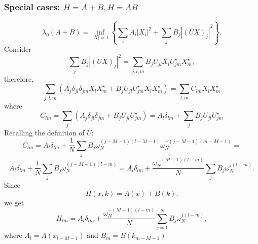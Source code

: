 \documentclass[12pt,a4paper]{article}
\begin{document}
\begin{appendices}
\subsubsection{Special cases: $H = A + B, H = AB$}
\[ \lambda_0 (A + B) = \inf_{| X | = 1} \left\{ \sum_i A_i  | X_i |^2 + \sum_j
   B_j | (U X)_j |^2 \right\} . \]
Consider
\[ \sum_j B_j | (U X)_j |^2 = \sum_{j, l, m} B_j U_{j l} X_l U^{\star}_{j m}
   X_m^{\star}, \]
therefore,
\[ \sum_{j, l, m} (A_j \delta_{j l} \delta_{j m} X_l X^{\star_{}}_m + B_j U_{j
   l} U_{j m}^{\star} X_l X^{\star_{}}_m) = \sum_{l, m} C_{l m} X_l
   X^{\star_{}}_m \]
where
\[ C_{l m} = \sum_j (A_j \delta_{j l} \delta_{j m} + B_j U_{j l} U_{j
   m}^{\star} ) = A_l \delta_{l m} + \sum_j B_j U_{j l} U_{j m}^{\star}  \]
Recalling the definition of $U :$
\[ C_{l m} = A_l \delta_{l m} + \frac{1}{N} \sum_j B_j \omega_N^{(j - M - 1) 
   (l - M - 1)} \omega_N^{- (j - M - 1)  (m - M - 1)} = \]
\[ A_l \delta_{l m} + \frac{1}{N} \sum_j B_j \omega_N^{(j - M - 1)  (l - m)} =
   A_l \delta_{l m} + \frac{\omega_N^{- (M + 1)  (l - m)}}{N} \sum_j B_j
   \omega_N^{j (l - m)} . \]
Since
\[ H (x, k) = A (x) + B (k) . \]
we get
\[ H_{l m} = A_l \delta_{l m} + \frac{\omega_N^{- (M + 1)  (l - m)}}{N}
   \sum_{j = 1}^N B_j \omega_N^{j (l - m)}, \]
where $A_l = A (x_{l - M - 1})$ and $B_m = B (k_{m - M - 1})$.
\

\end{appendices}
\end{document}
